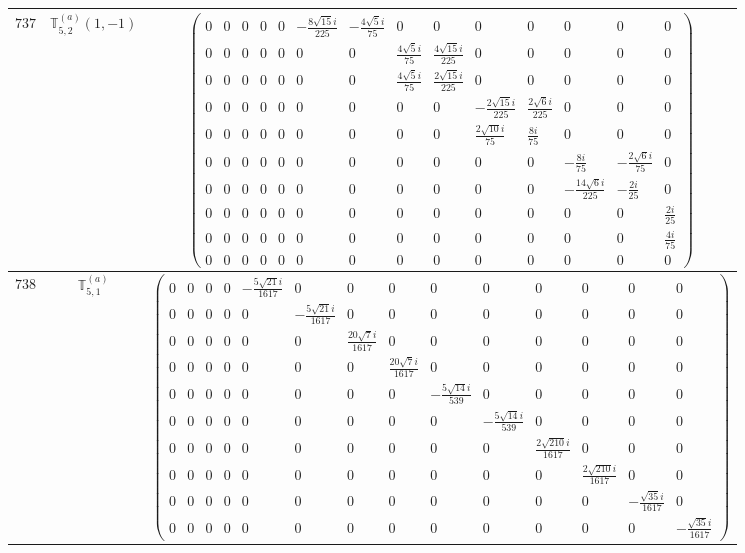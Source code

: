 \documentclass[fleqn,8pt,landscape]{jsarticle}
\begin{document}
\begin{center}
\begin{longtable}{ccc}
$ 737 $ & $ \mathbb{T}_{5,2}^{(a)}(1,-1) $ & $ \begin{pmatrix} 0 & 0 & 0 & 0 & 0 & - \frac{8 \sqrt{15} i}{225} & - \frac{4 \sqrt{5} i}{75} & 0 & 0 & 0 & 0 & 0 & 0 & 0 \\ 0 & 0 & 0 & 0 & 0 & 0 & 0 & \frac{4 \sqrt{5} i}{75} & \frac{4 \sqrt{15} i}{225} & 0 & 0 & 0 & 0 & 0 \\ 0 & 0 & 0 & 0 & 0 & 0 & 0 & \frac{4 \sqrt{5} i}{75} & \frac{2 \sqrt{15} i}{225} & 0 & 0 & 0 & 0 & 0 \\ 0 & 0 & 0 & 0 & 0 & 0 & 0 & 0 & 0 & - \frac{2 \sqrt{15} i}{225} & \frac{2 \sqrt{6} i}{225} & 0 & 0 & 0 \\ 0 & 0 & 0 & 0 & 0 & 0 & 0 & 0 & 0 & \frac{2 \sqrt{10} i}{75} & \frac{8 i}{75} & 0 & 0 & 0 \\ 0 & 0 & 0 & 0 & 0 & 0 & 0 & 0 & 0 & 0 & 0 & - \frac{8 i}{75} & - \frac{2 \sqrt{6} i}{75} & 0 \\ 0 & 0 & 0 & 0 & 0 & 0 & 0 & 0 & 0 & 0 & 0 & - \frac{14 \sqrt{6} i}{225} & - \frac{2 i}{25} & 0 \\ 0 & 0 & 0 & 0 & 0 & 0 & 0 & 0 & 0 & 0 & 0 & 0 & 0 & \frac{2 i}{25} \\ 0 & 0 & 0 & 0 & 0 & 0 & 0 & 0 & 0 & 0 & 0 & 0 & 0 & \frac{4 i}{75} \\ 0 & 0 & 0 & 0 & 0 & 0 & 0 & 0 & 0 & 0 & 0 & 0 & 0 & 0 \end{pmatrix} $ \\ \hline
$ 738 $ & $ \mathbb{T}_{5,1}^{(a)} $ & $ \begin{pmatrix} 0 & 0 & 0 & 0 & - \frac{5 \sqrt{21} i}{1617} & 0 & 0 & 0 & 0 & 0 & 0 & 0 & 0 & 0 \\ 0 & 0 & 0 & 0 & 0 & - \frac{5 \sqrt{21} i}{1617} & 0 & 0 & 0 & 0 & 0 & 0 & 0 & 0 \\ 0 & 0 & 0 & 0 & 0 & 0 & \frac{20 \sqrt{7} i}{1617} & 0 & 0 & 0 & 0 & 0 & 0 & 0 \\ 0 & 0 & 0 & 0 & 0 & 0 & 0 & \frac{20 \sqrt{7} i}{1617} & 0 & 0 & 0 & 0 & 0 & 0 \\ 0 & 0 & 0 & 0 & 0 & 0 & 0 & 0 & - \frac{5 \sqrt{14} i}{539} & 0 & 0 & 0 & 0 & 0 \\ 0 & 0 & 0 & 0 & 0 & 0 & 0 & 0 & 0 & - \frac{5 \sqrt{14} i}{539} & 0 & 0 & 0 & 0 \\ 0 & 0 & 0 & 0 & 0 & 0 & 0 & 0 & 0 & 0 & \frac{2 \sqrt{210} i}{1617} & 0 & 0 & 0 \\ 0 & 0 & 0 & 0 & 0 & 0 & 0 & 0 & 0 & 0 & 0 & \frac{2 \sqrt{210} i}{1617} & 0 & 0 \\ 0 & 0 & 0 & 0 & 0 & 0 & 0 & 0 & 0 & 0 & 0 & 0 & - \frac{\sqrt{35} i}{1617} & 0 \\ 0 & 0 & 0 & 0 & 0 & 0 & 0 & 0 & 0 & 0 & 0 & 0 & 0 & - \frac{\sqrt{35} i}{1617} \end{pmatrix} $ \\ \hline

\end{longtable}
\end{center}
\end{document}

